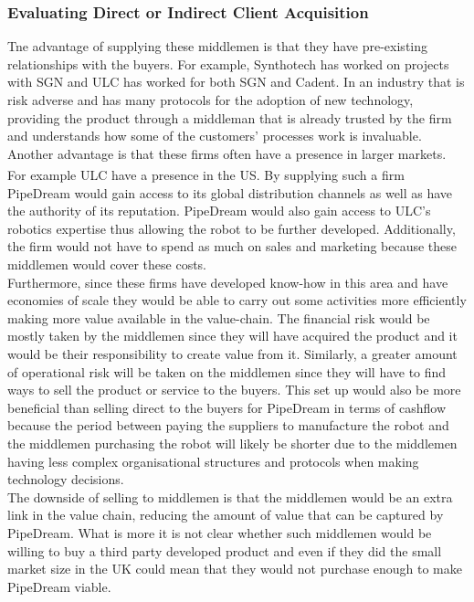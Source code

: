 \documentclass[11pt]{article}		%
\newcommand{\supercite}[1]{\textsuperscript{\cite{#1}}}		%
\begin{document}
    \subsubsection{Evaluating Direct or Indirect Client Acquisition}
    Tne advantage of supplying these middlemen is that they have pre-existing relationships with the buyers. For example, Synthotech has worked on projects with SGN and ULC has worked for both SGN and Cadent. In an industry that is risk adverse and has many protocols for the adoption of new technology, providing the product through a middleman that is already trusted by the firm and understands how some of the customers’ processes work is invaluable. Another advantage is that these firms often have a presence in larger markets. For example ULC have a presence in the US.\supercite{SPX_acquisition} By supplying such a firm PipeDream would gain access to its global distribution channels as well as have the authority of its reputation. PipeDream would also gain access to ULC’s robotics expertise thus allowing the robot to be further developed. Additionally, the firm would not have to spend as much on sales and marketing because these middlemen would cover these costs.
  \\ \hspace*{3ex}
    Furthermore, since these firms have developed know-how in this area and have economies of scale they would be able to carry out some activities more efficiently making more value available in the value-chain. The financial risk would be mostly taken by the middlemen since they will have acquired the product and it would be their responsibility to create value from it. Similarly, a greater amount of operational risk will be taken on the middlemen since they will have to find ways to sell the product or service to the buyers. This set up would also be more beneficial than selling direct to the buyers for PipeDream in terms of cashflow because the period between paying the suppliers to manufacture the robot and the middlemen purchasing the robot will likely be shorter due to the middlemen having less complex organisational structures and protocols when making technology decisions. 
\\ \hspace*{3ex}
The downside of selling to middlemen is that the middlemen would be an extra link in the value chain, reducing the amount of value that can be captured by PipeDream. What is more it is not clear whether such middlemen would be willing to buy a third party developed product and even if they did the small market size in the UK could mean that they would not purchase enough to make PipeDream viable. 
\end{document}
